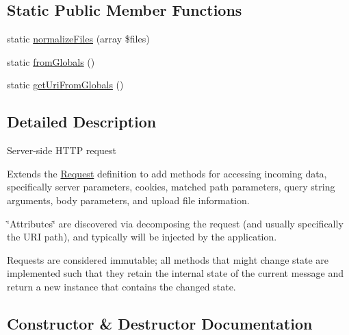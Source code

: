 \subsection*{Static Public Member Functions}
\begin{DoxyCompactItemize}
\item 
static \hyperlink{classGuzzleHttp_1_1Psr7_1_1ServerRequest_a48549f0f7b5b64b5d85bea840cff75bd}{normalize\+Files} (array \$files)
\item 
static \hyperlink{classGuzzleHttp_1_1Psr7_1_1ServerRequest_a9a021965df845c7efee446c7598a840c}{from\+Globals} ()
\item 
static \hyperlink{classGuzzleHttp_1_1Psr7_1_1ServerRequest_a12900f4d14ead81c214eb58810860c97}{get\+Uri\+From\+Globals} ()
\end{DoxyCompactItemize}


\subsection{Detailed Description}
Server-\/side H\+T\+TP request

Extends the \hyperlink{classGuzzleHttp_1_1Psr7_1_1Request}{Request} definition to add methods for accessing incoming data, specifically server parameters, cookies, matched path parameters, query string arguments, body parameters, and upload file information.

\char`\"{}\+Attributes\char`\"{} are discovered via decomposing the request (and usually specifically the U\+RI path), and typically will be injected by the application.

Requests are considered immutable; all methods that might change state are implemented such that they retain the internal state of the current message and return a new instance that contains the changed state. 

\subsection{Constructor \& Destructor Documentation}
\mbox{\label{classGuzzleHttp_1_1Psr7_1_1ServerRequest_a0c9bdff71ee836cda8126b974b182901}} 
